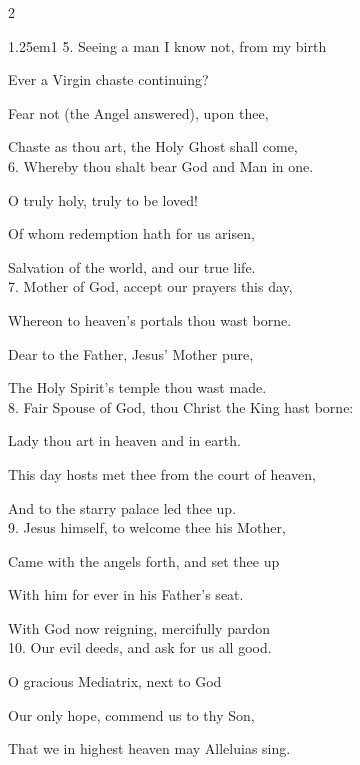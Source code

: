 \begin{multicols}{2}
\begin{hangparas}{1.25em}{1}
5. Seeing a man I know not, from my birth

Ever a Virgin chaste continuing?

Fear not (the Angel answered), upon thee,

Chaste as thou art, the Holy Ghost shall come,\\


6. Whereby thou shalt bear God and Man in one.

O truly holy, truly to be loved!

Of whom redemption hath for us arisen,

Salvation of the world, and our true life.\\


7. Mother of God, accept our prayers this day,

Whereon to heaven's portals thou wast borne.

Dear to the Father, Jesus' Mother pure,

The Holy Spirit's temple thou wast made.\\


8. Fair Spouse of God, thou Christ the King hast borne:

Lady thou art in heaven and in earth.

This day hosts met thee from the court of heaven,

And to the starry palace led thee up.\\


9. Jesus himself, to welcome thee his Mother,

Came with the angels forth, and set thee up

With him for ever in his Father's seat.

With God now reigning, mercifully pardon\\


10. Our evil deeds, and ask for us all good.

O gracious Mediatrix, next to God

\newcolumn

Our only hope, commend us to thy Son,

That we in highest heaven may Alleluias sing.
\end{hangparas}
\end{multicols}


